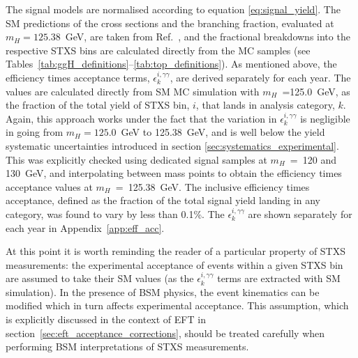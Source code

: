The signal models are normalised according to equation \ref{eq:signal_yield}. The SM predictions of the cross sections and the \Hgg branching fraction, evaluated at $m_H=125.38$~GeV, are taken from Ref.~\cite{deFlorian:2016spz}, and the fractional breakdowns into the respective STXS bins are calculated directly from the MC samples (see Tables~\ref{tab:ggH_definitions}--\ref{tab:top_definitions}). As mentioned above, the efficiency times acceptance terms, $\epsilon^{i,\gamma\gamma}_{k}$, are derived separately for each year. The values are calculated directly from SM MC simulation with $m_H$~=125.0~GeV, as the fraction of the total yield of STXS bin, $i$, that lands in analysis category, $k$. Again, this approach works under the fact that the variation in $\epsilon^{i,\gamma\gamma}_{k}$ is negligible in going from $m_H=125.0$~GeV to 125.38~GeV, and is well below the yield systematic uncertainties introduced in section \ref{sec:systematics_experimental}. This was explicitly checked using dedicated signal samples at $m_H$~=~120 and 130~GeV, and interpolating between mass points to obtain the efficiency times acceptance values at $m_H$~=~125.38~GeV. The inclusive efficiency times acceptance, defined as the fraction of the total signal yield landing in any category, was found to vary by less than 0.1\%. The $\epsilon^{i,\gamma\gamma}_{k}$ are shown separately for each year in Appendix~\ref{app:eff_acc}.

At this point it is worth reminding the reader of a particular property of STXS measurements: the experimental acceptance of events within a given STXS bin are assumed to take their SM values (as the $\epsilon^{i,\gamma\gamma}_{k}$ terms are extracted with SM simulation). In the presence of BSM physics, the event kinematics can be modified which in turn affects experimental acceptance. This assumption, which is explicitly discussed in the context of EFT in section~\ref{sec:eft_acceptance_corrections}, should be treated carefully when performing BSM interpretations of STXS measurements. 


